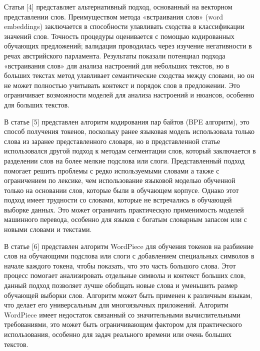 \begin{multicols}{2}
Статья {[}4{]} представляет альтернативный подход, основанный на
векторном представлении слов. Преимуществом метода «встраивания слов»
(word embeddings) заключается в способности улавливать сходства в
классификации значений слов. Точность процедуры оценивается с помощью
кодированных обучающих предложений; валидация проводилась через изучение
негативности в речах австрийского парламента. Результаты показали
потенциал подхода «встраивания слов» для анализа настроений для
небольших текстов, но в больших текстах метод улавливает семантические
сходства между словами, но он не может полностью учитывать контекст и
порядок слов в предложении. Это ограничивает возможности моделей для
анализа настроений и нюансов, особенно для больших текстов.

В статье {[}5{]} представлен алгоритм кодирования пар байтов (BPE
алгоритм), это способ получения токенов, поскольку ранее языковая модель
использовала только слова из заранее представленного словаря, но в
представленной статье использовался другой подход к методам сегментации
слов, который заключается в разделении слов на более мелкие подслова или
слоги. Представленный подход помогает решить проблемы с редко
используемыми словами а также с ограничением по лексике, чем
использование языковой моделью обученной только на основании слов,
которые были в обучающем корпусе. Однако этот подход имеет трудности со
словами, которые не встречались в обучающей выборке данных. Это может
ограничить практическую применимость моделей машинного перевода,
особенно для языков с богатым словарным запасом или с новыми словами и
текстами.

В статье {[}6{]} представлен алгоритм WordPiece для обучения токенов на
разбиение слов на обучающими подслова или слоги с добавлением
специальных символов в начале каждого токена, чтобы показать, что это
часть большого слова. Этот процесс помогает анализировать отдельные
символы и контекст больших слов, данный подход позволяет лучше обобщать
новые слова и уменьшить размер обучающей выборки слов. Алгоритм может
быть применен к различным языкам, что делает его универсальным для
многоязычных приложений. Алгоритм WordPiece имеет недостаток связанный
со значительными вычислительными требованиями, это может быть
ограничивающим фактором для практического использования, особенно для
задач реального времени или очень больших текстов.


\end{multicols}
